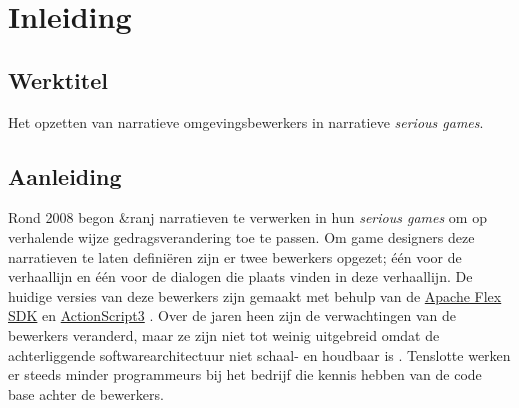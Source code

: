 \documentclass{report}
\newcommand{\organisation}{\&ranj}
\begin{document}
\newpage

\tableofcontents

\chapter{Inleiding}
\section{Werktitel}
Het opzetten van narratieve omgevingsbewerkers in narratieve \emph{serious games}.

\section{Aanleiding} %

Rond 2008 begon \organisation{} narratieven te verwerken in hun \emph{serious games} om op verhalende wijze gedragsverandering toe te passen. Om game designers deze narratieven te laten defini{\"e}ren zijn er twee bewerkers opgezet; {\'e}{\'e}n voor de verhaallijn en {\'e}{\'e}n voor de dialogen die plaats vinden in deze verhaallijn. De huidige versies van deze bewerkers zijn gemaakt met behulp van de \href{https://en.wikipedia.org/wiki/Apache_Flex}{Apache Flex SDK} en \href{http://www.adobe.com/devnet/actionscript/articles/actionscript3_overview.html}{ActionScript3} \cite{interviewivo}.
Over de jaren heen zijn de verwachtingen van de bewerkers veranderd, maar ze zijn niet tot weinig uitgebreid omdat de achterliggende softwarearchitectuur niet schaal- en houdbaar is \cite{interviewivo}. Tenslotte werken er steeds minder programmeurs bij het bedrijf die kennis hebben van de code base achter de bewerkers.
\end{document}
